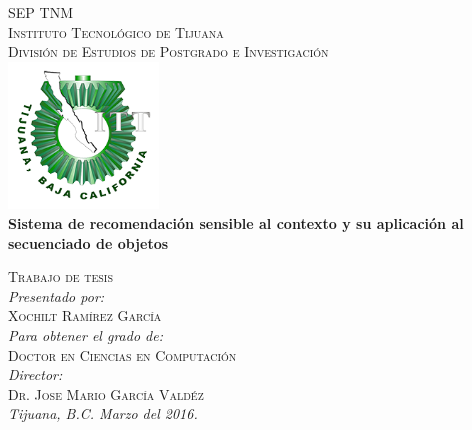 \documentclass{article}
\begin{document}
 

\begin{center} 
{\textsc{\Large SEP } \hfill  \textsc{\Large TNM}}\\[0.3cm]
	\textsc{\Large Instituto Tecnol\'ogico de Tijuana}\\[0.5cm]
	\textsc{\Large Divisi\'on de Estudios de Postgrado e Investigaci\'on }\\[1.0cm]
	\includegraphics[width=0.3\textwidth]{img/logotec1}\\[0.5cm] %
	{ \LARGE \bfseries Sistema de recomendaci\'on sensible al contexto y su aplicaci\'on al secuenciado de objetos}\\ [2.0cm]
\end{center}

 \begin{minipage}{1.0\textwidth}
 	\begin{flushright} 
 	\textsc{Trabajo de tesis}\\[0.4cm]
 	\emph{Presentado por:} \\
 	\textsc{ Xochilt Ram\'irez Garc\'ia}\\
	\emph{Para obtener el grado de:} \\
 	\textsc{Doctor en Ciencias en Computaci\'on} \\
	\emph{Director:} \\
 	\textsc{Dr. Jose Mario Garc­\'ia Vald\'ez} \\
	\emph{Tijuana, B.C. Marzo del 2016.}
 	\end{flushright}
\end{minipage}
\end{document}
